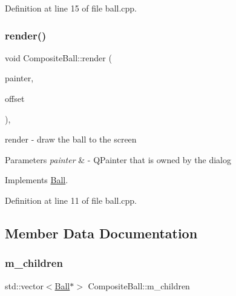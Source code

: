 Definition at line 15 of file ball.\+cpp.

\mbox{\label{class_composite_ball_a2aefe32771e1cde5dc8f51d779c880eb}} 
\subsubsection{\texorpdfstring{render()}{render()}}
{\footnotesize\ttfamily void Composite\+Ball\+::render (\begin{DoxyParamCaption}\item[{Q\+Painter \&}]{painter,  }\item[{const Q\+Vector2D \&}]{offset }\end{DoxyParamCaption})\hspace{0.3cm}{\ttfamily [override]}, {\ttfamily [virtual]}}



render -\/ draw the ball to the screen 


\begin{DoxyParams}{Parameters}
{\em painter} & -\/ Q\+Painter that is owned by the dialog \\
\hline
\end{DoxyParams}


Implements \mbox{\hyperlink{class_ball_a307773aaa59aee90cef8767b0c22deca}{Ball}}.



Definition at line 11 of file ball.\+cpp.



\subsection{Member Data Documentation}
\mbox{\label{class_composite_ball_a2689ad5361a52d586f43dafd8922a422}} 
\subsubsection{\texorpdfstring{m\+\_\+children}{m\_children}}
{\footnotesize\ttfamily std\+::vector$<$\mbox{\hyperlink{class_ball}{Ball}}$\ast$$>$ Composite\+Ball\+::m\+\_\+children\hspace{0.3cm}{\ttfamily [protected]}}



